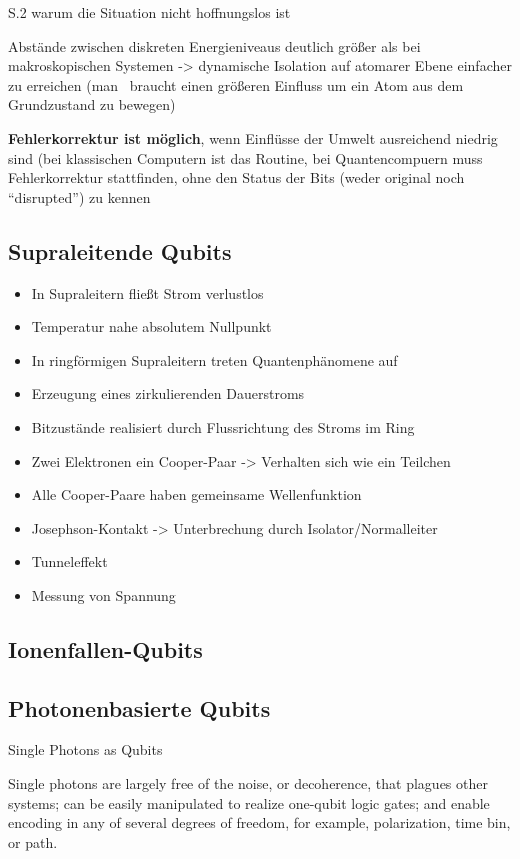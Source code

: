 S.2 warum die Situation nicht hoffnungslos ist

Abstände zwischen diskreten Energieniveaus deutlich größer als bei makroskopischen Systemen -> dynamische Isolation auf atomarer Ebene einfacher zu erreichen (man  braucht einen größeren Einfluss um ein Atom aus dem Grundzustand zu bewegen) 

\textbf{Fehlerkorrektur ist möglich}, wenn Einflüsse der Umwelt ausreichend niedrig sind (bei klassischen Computern ist das Routine, bei Quantencompuern muss Fehlerkorrektur stattfinden, ohne den Status der Bits (weder original noch “disrupted”) zu kennen 
 

 \cite{mermin_quantum_2012}
\subsection{Supraleitende Qubits }

\begin{itemize}
\item In Supraleitern fließt Strom verlustlos
\item Temperatur nahe absolutem Nullpunkt
\item In ringförmigen Supraleitern treten Quantenphänomene auf
\item Erzeugung eines zirkulierenden Dauerstroms
\item Bitzustände realisiert durch Flussrichtung des Stroms im Ring
\item Zwei Elektronen ein Cooper-Paar -> Verhalten sich wie ein Teilchen
\item Alle Cooper-Paare haben gemeinsame Wellenfunktion
\item Josephson-Kontakt -> Unterbrechung durch Isolator/Normalleiter
\item Tunneleffekt
\item Messung von Spannung
\end{itemize}

\subsection{Ionenfallen-Qubits }
\subsection{Photonenbasierte Qubits}

Single Photons as Qubits 

Single photons are largely free of the noise, or decoherence, that plagues other systems; can be easily manipulated to realize one-qubit logic gates; and enable encoding in any of several degrees of freedom, for example, polarization, time bin, or path. 
\cite{obrien_optical_2007}



